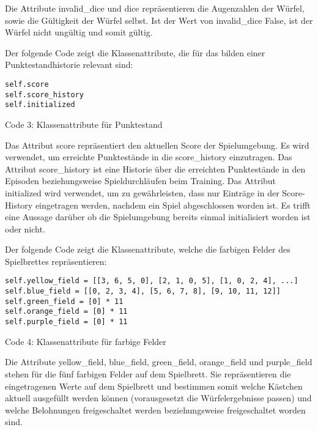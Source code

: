 Die Attribute invalid\_dice und dice repräsentieren die Augenzahlen der Würfel, sowie die Gültigkeit der Würfel selbst. Ist der Wert von invalid\_dice False, ist der Würfel nicht ungültig und somit gültig.\\

\begin{minipage}{\linewidth}
Der folgende Code zeigt die Klassenattribute, die für das bilden einer Punktestandhistorie relevant sind:
\vspace{0.5cm}
\begin{lstlisting}
self.score
self.score_history
self.initialized
\end{lstlisting}
Code 3: Klassenattribute für Punktestand\\
\end{minipage}

Das Attribut score repräsentiert den aktuellen Score der Spielumgebung. Es wird verwendet, um erreichte Punktestände in die score\_history einzutragen. Das Attribut score\_history ist eine Historie über die erreichten Punktestände in den Episoden beziehungsweise Spieldurchläufen beim Training. Das Attribut initialized wird verwendet, um zu gewährleisten, dass nur Einträge in der Score-History eingetragen werden, nachdem ein Spiel abgeschlossen worden ist. Es trifft eine Aussage darüber ob die Spielumgebung bereits einmal initialisiert worden ist oder nicht.\\

\begin{minipage}{\linewidth}
Der folgende Code zeigt die Klassenattribute, welche die farbigen Felder des Spielbrettes repräsentieren:
\vspace{0.5cm}
\begin{lstlisting}
self.yellow_field = [[3, 6, 5, 0], [2, 1, 0, 5], [1, 0, 2, 4], ...]
self.blue_field = [[0, 2, 3, 4], [5, 6, 7, 8], [9, 10, 11, 12]]
self.green_field = [0] * 11
self.orange_field = [0] * 11
self.purple_field = [0] * 11
\end{lstlisting}
Code 4: Klassenattribute für farbige Felder\\
\end{minipage}

Die Attribute yellow\_field, blue\_field, green\_field, orange\_field und purple\_field stehen für die fünf farbigen Felder auf dem Spielbrett. Sie repräsentieren die eingetragenen Werte auf dem Spielbrett und bestimmen somit welche Kästchen aktuell ausgefüllt werden können (vorausgesetzt die Würfelergebnisse passen) und welche Belohnungen freigeschaltet werden beziehungsweise freigeschaltet worden sind.\\

